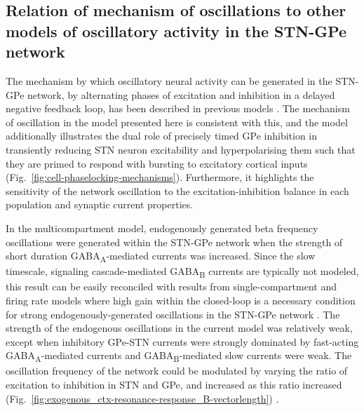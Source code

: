 %
%
%
%

\subsection{Relation of mechanism of oscillations to other models of oscillatory activity in the STN-GPe network}
\label{sec:ch3-disc:osc-mech-others}

%
%
%

%
The mechanism by which oscillatory neural activity can be generated in the STN-GPe network, by alternating phases of excitation and inhibition in a delayed negative feedback loop, has been described in previous models \cite{terman_activity_2002,holgado_conditions_2010,kumar_role_2011}. The mechanism of oscillation in the model presented here is consistent with this, and the model additionally illustrates the dual role of precisely timed GPe inhibition in transiently reducing STN neuron excitability and hyperpolarising them such that they are primed to respond with bursting to excitatory cortical inputs (Fig.~\ref{fig:cell-phaselocking-mechanisms}). Furthermore, it highlights the sensitivity of the network oscillation to the excitation-inhibition balance in each population and synaptic current properties.

%
In the multicompartment model, endogenously generated beta frequency oscillations were generated within the STN-GPe network when the strength of short duration GABA\textsubscript{A}-mediated currents was increased. Since the slow timescale, signaling cascade-mediated GABA\textsubscript{B} currents are typically not modeled, this result can be easily reconciled with results from single-compartment and firing rate models where high gain within the closed-loop is a necessary condition for strong endogenously-generated oscillations in the STN-GPe network \cite{holgado_conditions_2010,pavlides_improved_2012,park_neural_2011,wei_role_2015}. The strength of the endogenous oscillations in the current model was relatively weak, except when inhibitory GPe-STN currents were strongly dominated by fast-acting GABA\textsubscript{A}-mediated currents and GABA\textsubscript{B}-mediated slow currents were weak. The oscillation frequency of the network could be modulated by varying the ratio of excitation to inhibition in STN and GPe, and increased as this ratio increased (Fig.~\ref{fig:exogenous_ctx-resonance-response_B-vectorlength}) .

